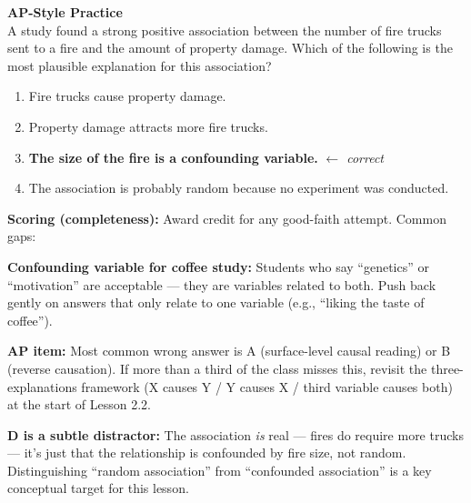 \documentclass[10pt]{article}
\begin{document}
\begin{tcolorbox}[colback=redbg, colframe=redacc, boxrule=0.8pt, arc=2mm,
    left=4mm, right=4mm, top=3mm, bottom=3mm]
\small\textbf{AP-Style Practice}\\[6pt]
A study found a strong positive association between the number of fire trucks sent to
a fire and the amount of property damage. Which of the following is the most plausible
explanation for this association?

\vspace{10pt}
\begin{enumerate}[label=\textbf{(\Alph*)}, leftmargin=2em, itemsep=6pt]
  \item Fire trucks cause property damage.
  \item Property damage attracts more fire trucks.
  \item \textbf{\textcolor{keyred}{The size of the fire is a confounding variable.}}
        \textcolor{keyred}{\textit{$\leftarrow$ correct}}
  \item The association is probably random because no experiment was conducted.
\end{enumerate}
\end{tcolorbox}

\vspace{0.1in}
\noindent{} \quad
{}

\vspace{0.12in}
\begin{teachernote}
\textbf{Scoring (completeness):}
Award credit for any good-faith attempt. Common gaps:

\textbf{Confounding variable for coffee study:} Students who say ``genetics'' or
``motivation'' are acceptable --- they are variables related to both. Push back gently
on answers that only relate to one variable (e.g., ``liking the taste of coffee'').

\textbf{AP item:} Most common wrong answer is A (surface-level causal reading) or B
(reverse causation). If more than a third of the class misses this, revisit the
three-explanations framework (X causes Y / Y causes X / third variable causes both)
at the start of Lesson 2.2.

\textbf{D is a subtle distractor:} The association \emph{is} real --- fires do require more
trucks --- it's just that the relationship is confounded by fire size, not random.
Distinguishing ``random association'' from ``confounded association'' is a key conceptual
target for this lesson.
\end{teachernote}
\end{document}
